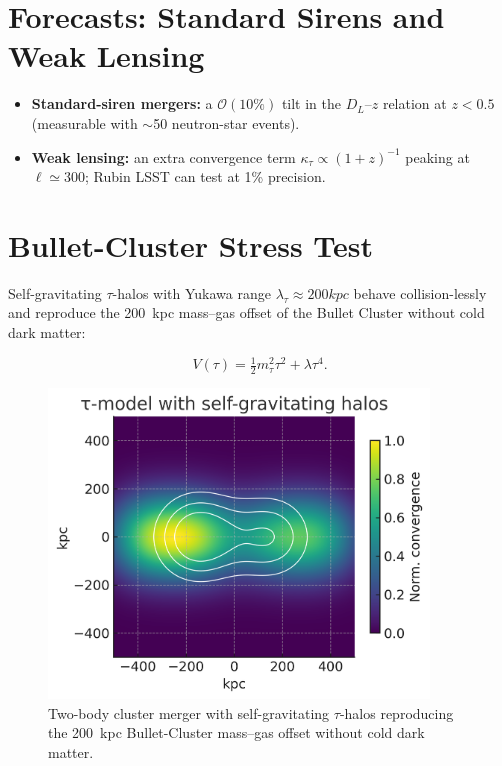 
\section{Forecasts: Standard Sirens and Weak Lensing}

\begin{itemize}
  \item \textbf{Standard-siren mergers:} a $\mathcal{O}(10\%)$ tilt in the $D_{L}$–$z$ relation at $z<0.5$ (measurable with $\sim$50 neutron-star events).
  \item \textbf{Weak lensing:} an extra convergence term $\kappa_{\tau}\!\propto\!(1+z)^{-1}$ peaking at $\ell\simeq300$; Rubin LSST can test at 1\% precision.
\end{itemize}


\section{Bullet-Cluster Stress Test}
\label{sec:bullet-cluster}

Self-gravitating $\tau$-halos with Yukawa range $\lambda_{\tau}\!\approx\!200\si{kpc}$ behave collision-lessly and reproduce the \SI{200}{kpc} mass–gas offset of the Bullet Cluster without cold dark matter:

\[
V(\tau)=\tfrac12 m_{\tau}^{2}\tau^{2}+\lambda\tau^{4}.
\]

\begin{figure}[htbp]
  \centering
  \includegraphics[width=0.9\textwidth]{images/fig11_Twobody_Cluster.png}
  \caption{Two-body cluster merger with self-gravitating $\tau$-halos reproducing the \SI{200}{kpc} Bullet-Cluster mass–gas offset without cold dark matter.}
  \label{fig:BulletCluster}
\end{figure}


